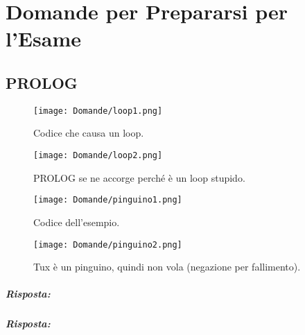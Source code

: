 \chapter{Domande per Prepararsi per l'Esame}

\section{PROLOG}



\begin{figure}[h]
    \centering
    \begin{minipage}{0.45\textwidth}
        \centering
        \texttt{[image: Domande/loop1.png]}
        \caption{Codice che causa un loop.}
    \end{minipage}
    \hfill
    \begin{minipage}{0.45\textwidth}
        \centering
        \texttt{[image: Domande/loop2.png]}
        \caption{PROLOG se ne accorge perché è un loop stupido.}
    \end{minipage}
\end{figure}



\begin{figure}[h]
    \centering
    \begin{minipage}{0.45\textwidth}
        \centering
        \texttt{[image: Domande/pinguino1.png]}
        \caption{Codice dell'esempio.}
    \end{minipage}
    \hfill
    \begin{minipage}{0.45\textwidth}
        \centering
        \texttt{[image: Domande/pinguino2.png]}
        \caption{Tux è un pinguino, quindi non vola (negazione per fallimento).}
    \end{minipage}
\end{figure}




\paragraph{Risposta:}


\paragraph{Risposta:}

